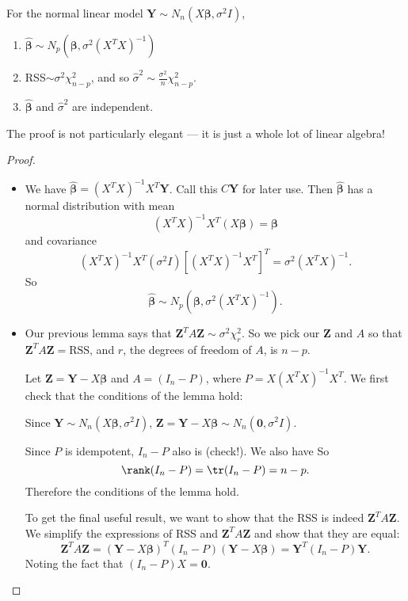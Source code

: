 \documentclass[a4paper]{article}
\begin{document}
\begin{thm}[]
  For the normal linear model $\mathbf{Y}\sim N_n(X\boldsymbol\beta, \sigma^2 I)$,
  \begin{enumerate}
    \item $\hat{\boldsymbol\beta} \sim N_p(\boldsymbol\beta, \sigma^2(X^TX)^{-1})$
    \item RSS$\sim \sigma^2 \chi_{n - p}^2$, and so $\hat{\sigma}^2 \sim \frac{\sigma^2}{n}\chi_{n -p}^2$.
    \item $\hat{\boldsymbol\beta}$ and $\hat{\sigma}^2$ are independent.
  \end{enumerate}
\end{thm}

The proof is not particularly elegant --- it is just a whole lot of linear algebra!

\begin{proof}\leavevmode
  \begin{itemize}
    \item We have $\hat{\boldsymbol\beta} = (X^TX)^{-1}X^T\mathbf{Y}$. Call this $C\mathbf{Y}$ for later use. Then $\hat {\boldsymbol\beta}$ has a normal distribution with mean
      \[
        (X^TX)^{-1}X^T(X\boldsymbol\beta) = \boldsymbol\beta
      \]
      and covariance
      \[
        (X^TX)^{-1}X^T(\sigma^2 I)[(X^TX)^{-1}X^T]^T = \sigma^2(X^TX)^{-1}.
      \]
      So
      \[
        \hat{\boldsymbol\beta}\sim N_p(\boldsymbol\beta, \sigma^2(X^TX)^{-1}).
      \]
    \item
      Our previous lemma says that $\mathbf{Z}^TA\mathbf{Z}\sim \sigma^2 \chi_r^2$. So we pick our $\mathbf{Z}$ and $A$ so that $\mathbf{Z}^TA\mathbf{Z} = \mathrm{RSS}$, and $r$, the degrees of freedom of $A$, is $n - p$.

      Let $\mathbf{Z} = \mathbf{Y} - X\boldsymbol\beta$ and $A = (I_n - P)$, where $P = X(X^TX)^{-1}X^T$. We first check that the conditions of the lemma hold:

      Since $\mathbf{Y}\sim N_n(X\boldsymbol\beta, \sigma^2 I)$, $\mathbf{Z} = \mathbf{Y} - X\boldsymbol\beta\sim N_n(\mathbf{0}, \sigma^2 I)$.

      Since $P$ is idempotent, $I_n - P$ also is (check!). We also have
      So
      \[
        \rank(I_n - P) = \tr(I_n - P) = n - p.
      \]
      Therefore the conditions of the lemma hold.

      To get the final useful result, we want to show that the RSS is indeed $\mathbf{Z}^TA\mathbf{Z}$. We simplify the expressions of RSS and $\mathbf{Z}^TA\mathbf{Z}$ and show that they are equal:
      \[
        \mathbf{Z}^TA\mathbf{Z} = (\mathbf{Y} - X\boldsymbol\beta)^T(I_n - P)(\mathbf{Y} - X\boldsymbol\beta)=\mathbf{Y}^T(I_n - P)\mathbf{Y}.
      \]
      Noting the fact that $(I_n - P)X = \mathbf{0}$.


\end{itemize}
\end{proof}
\end{document}
